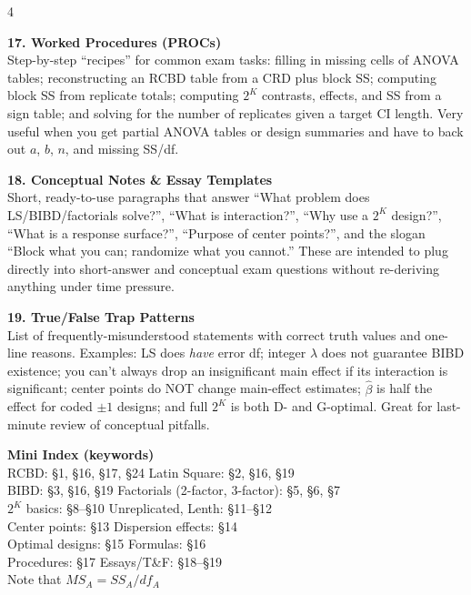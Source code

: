\documentclass[7pt,letterpaper,landscape]{extarticle}
\begin{document}
\begin{multicols*}{4}
{\textbf{17. Worked Procedures (PROCs)}\\
Step-by-step “recipes” for common exam tasks: filling in missing cells of ANOVA tables; reconstructing an RCBD table from a CRD plus block SS; computing block SS from replicate totals; computing $2^K$ contrasts, effects, and SS from a sign table; and solving for the number of replicates given a target CI length. Very useful when you get partial ANOVA tables or design summaries and have to back out $a$, $b$, $n$, and missing SS/df.

\textbf{18. Conceptual Notes \& Essay Templates}\\
Short, ready-to-use paragraphs that answer “What problem does LS/BIBD/factorials solve?”, “What is interaction?”, “Why use a $2^K$ design?”, “What is a response surface?”, “Purpose of center points?”, and the slogan “Block what you can; randomize what you cannot.” These are intended to plug directly into short-answer and conceptual exam questions without re-deriving anything under time pressure.

\textbf{19. True/False Trap Patterns}\\
List of frequently-misunderstood statements with correct truth values and one-line reasons. Examples: LS does \emph{have} error df; integer $\lambda$ does not guarantee BIBD existence; you can’t always drop an insignificant main effect if its interaction is significant; center points do NOT change main-effect estimates; $\hat\beta$ is half the effect for coded $\pm1$ designs; and full $2^K$ is both D- and G-optimal. Great for last-minute review of conceptual pitfalls.

\vspace{2pt}
\textbf{Mini Index (keywords)}\\
RCBD: \S1, \S16, \S17, \S24\quad
Latin Square: \S2, \S16, \S19\\
BIBD: \S3, \S16, \S19\quad
Factorials (2-factor, 3-factor): \S5, \S6, \S7\\
$2^K$ basics: \S8–\S10\quad
Unreplicated, Lenth: \S11–\S12\\
Center points: \S13\quad
Dispersion effects: \S14\\
Optimal designs: \S15\quad
Formulas: \S16\\
Procedures: \S17\quad
Essays/T\&F: \S18–\S19\\
Note that $MS_A = SS_A / df_A$
\par}




\end{multicols*}
\end{document}
